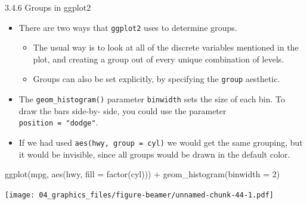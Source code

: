 \documentclass[
  9pt,
  a4paper,
  ignorenonframetext,
  notheorems]{beamer}
\newenvironment{Shaded}{\begin{snugshade}}{\end{snugshade}}
\newcommand{\AttributeTok}[1]{\textcolor[rgb]{0.40,0.45,0.13}{#1}}
\newcommand{\DecValTok}[1]{\textcolor[rgb]{0.68,0.00,0.00}{#1}}
\newcommand{\FunctionTok}[1]{\textcolor[rgb]{0.28,0.35,0.67}{#1}}
\newcommand{\NormalTok}[1]{\textcolor[rgb]{0.00,0.23,0.31}{#1}}
\newcommand{\SpecialCharTok}[1]{\textcolor[rgb]{0.37,0.37,0.37}{#1}}
\providecommand{\tightlist}{%
  \setlength{\itemsep}{0pt}\setlength{\parskip}{0pt}}\usepackage{longtable,booktabs,array}
\begin{document}
\begin{frame}[fragile]
\begin{block}{3.4.6 Groups in ggplot2}
\protect\hypertarget{groups-in-ggplot2}{}
\begin{itemize}
\item
  There are two ways that \texttt{ggplot2} uses to determine groups.

  \begin{itemize}
  \tightlist
  \item
    The usual way is to look at all of the discrete variables mentioned
    in the plot, and creating a group out of every unique combination of
    levels.
  \item
    Groups can also be set explicitly, by specifying the \texttt{group}
    aesthetic.
  \end{itemize}
\item
  The \texttt{geom\_histogram()} parameter \texttt{binwidth} sets the
  size of each bin. To draw the bars side-by- side, you could use the
  parameter \texttt{position\ =\ "dodge"}.
\item
  If we had used \texttt{aes(hwy,\ group\ =\ cyl)} we would get the same
  grouping, but it would be invisible, since all groups would be drawn
  in the default color.
\end{itemize}
\end{block}
\end{frame}

\begin{frame}[fragile]
\begin{Shaded}
\begin{Highlighting}[]
\FunctionTok{ggplot}\NormalTok{(mpg, }\FunctionTok{aes}\NormalTok{(hwy, }\AttributeTok{fill =} \FunctionTok{factor}\NormalTok{(cyl))) }\SpecialCharTok{+}
  \FunctionTok{geom\_histogram}\NormalTok{(}\AttributeTok{binwidth =} \DecValTok{2}\NormalTok{)}
\end{Highlighting}
\end{Shaded}

\texttt{[image: 04\_graphics\_files/figure-beamer/unnamed-chunk-44-1.pdf]}
\end{frame}
\end{document}
